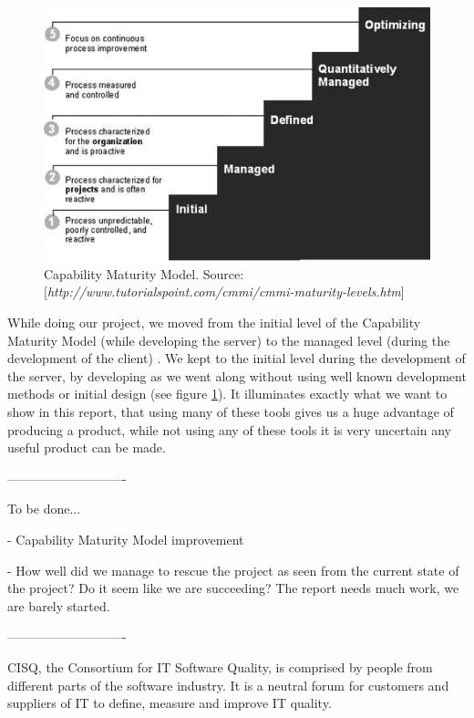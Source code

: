 \begin{figure}[t]
  \includegraphics[width=\textwidth]{illustrations/CMM.jpg}
  \caption{Capability Maturity Model. Source: [\textit{http://www.tutorialspoint.com/cmmi/cmmi-maturity-levels.htm}]}
  \label{fig:Capability_Maturity_Model}
\end{figure}

While doing our project, we moved from the initial level of the Capability Maturity Model (while developing the server) to the managed level (during the development of the client) \cite[p. 242]{PM}. We kept to the initial level during the development of the server, by developing as we went along without using well known development methods or initial design (see figure \ref{fig:Capability_Maturity_Model}). It illuminates exactly what we want to show in this report, that using many of these tools gives us a huge advantage of producing a product, while not using any of these tools it is very uncertain any useful product can be made.

----------------------------

To be done...

- Capability Maturity Model improvement

- How well did we manage to rescue the project as seen from the current state of the project? Do it seem like we are succeeding? The report needs much work, we are barely started.
 
----------------------------

CISQ, the Consortium for IT Software Quality, is comprised by people from different parts of the software industry. It is a neutral forum for customers and suppliers of IT to define, measure and improve IT quality.

